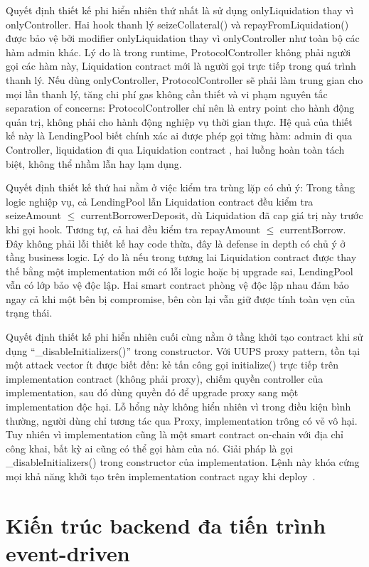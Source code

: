 \documentclass[../DoAn.tex]{subfiles}
\begin{document}
Quyết định thiết kế phi hiển nhiên thứ nhất là sử dụng onlyLiquidation thay vì onlyController. Hai hook thanh lý seizeCollateral() và repayFromLiquidation() được bảo vệ bởi modifier onlyLiquidation thay vì onlyController như toàn bộ các hàm admin khác. Lý do là trong runtime, ProtocolController không phải người gọi các hàm này, Liquidation contract mới là người gọi trực tiếp trong quá trình thanh lý. Nếu dùng onlyController, ProtocolController sẽ phải làm trung gian cho mọi lần thanh lý, tăng chi phí gas không cần thiết và vi phạm nguyên tắc separation of concerns: ProtocolController chỉ nên là entry point cho hành động quản trị, không phải cho hành động nghiệp vụ thời gian thực. Hệ quả của thiết kế này là LendingPool biết chính xác ai được phép gọi từng hàm: admin đi qua Controller, liquidation đi qua Liquidation contract , hai luồng hoàn toàn tách biệt, không thể nhầm lẫn hay lạm dụng.

Quyết định thiết kế thứ hai nằm ở việc kiểm tra trùng lặp có chủ ý: Trong tầng logic nghiệp vụ, cả LendingPool lẫn Liquidation contract đều kiểm tra seizeAmount $\leq$ currentBorrowerDeposit, dù Liquidation đã cap giá trị này trước khi gọi hook. Tương tự, cả hai đều kiểm tra repayAmount $\leq$ currentBorrow. Đây không phải lỗi thiết kế hay code thừa, đây là defense in depth có chủ ý ở tầng business logic. Lý do là nếu trong tương lai Liquidation contract được thay thế bằng một implementation mới có lỗi logic hoặc bị upgrade sai, LendingPool vẫn có lớp bảo vệ độc lập. Hai smart contract phòng vệ độc lập nhau đảm bảo ngay cả khi một bên bị compromise, bên còn lại vẫn giữ được tính toàn vẹn của trạng thái.

Quyết định thiết kế phi hiển nhiên cuối cùng nằm ở tầng khởi tạo contract khi sử dụng “\_disableInitializers()” trong constructor. Với UUPS proxy pattern, tồn tại một attack vector ít được biết đến: kẻ tấn công gọi initialize() trực tiếp trên implementation contract (không phải proxy), chiếm quyền controller của implementation, sau đó dùng quyền đó để upgrade proxy sang một implementation độc hại. Lỗ hổng này không hiển nhiên vì trong điều kiện bình thường, người dùng chỉ tương tác qua Proxy, implementation trông có vẻ vô hại. Tuy nhiên vì implementation cũng là một smart contract on-chain với địa chỉ công khai, bất kỳ ai cũng có thể gọi hàm của nó. Giải pháp là gọi \_disableInitializers() trong constructor của implementation. Lệnh này khóa cứng mọi khả năng khởi tạo trên implementation contract ngay khi deploy~\cite{OpenZeppelinDocs}.

\section{Kiến trúc backend đa tiến trình event-driven}
\label{section:5.4}
\end{document}
